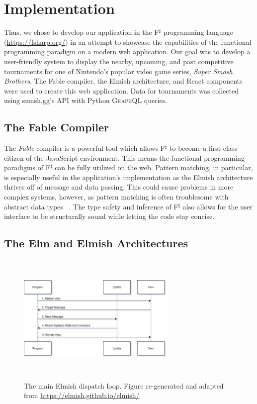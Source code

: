 \documentclass[sigconf]{acmart}
\begin{document}
\section{Implementation}

Thus, we chose to develop our application in the F$^{\sharp}$ programming language (\url{https://fsharp.org/}) in an attempt to showcase the capabilities of the functional programming paradigm on a modern web application. Our goal was to develop a user-friendly system to display the nearby, upcoming, and past competitive tournaments for one of Nintendo's popular video game series, \textit{Super Smash Brothers}. The Fable compiler, the Elmish architecture, and React components were used to create this web application. Data for tournaments was collected using smash.gg's \textsc{API} with Python \textsc{GraphQL} queries.

\subsection{The Fable Compiler}

The \textit{Fable} compiler is a powerful tool which allows F$^{\sharp}$ to become a first-class citizen of the JavaScript environment. This means the functional programming paradigms of F$^{\sharp}$ can be fully utilized on the web. Pattern matching, in particular, is especially useful in the application's implementation as the Elmish architecture thrives off of message and data passing. This could cause problems in more complex systems, however, as pattern matching is often troublesome with abstract data types ~\cite{pattern}. The type safety and inference of F$^{\sharp}$ also allows for the user interface to be structurally sound while letting the code stay concise.

\subsection{The Elm and Elmish Architectures}

\begin{figure}
\includegraphics[height=2.5in, width=3in]{dispatchloop}
\caption{The main Elmish dispatch loop. Figure re-generated and adapted from \url{https://elmish.github.io/elmish/}}\label{dispatchloop}\end{figure}
\end{document}
